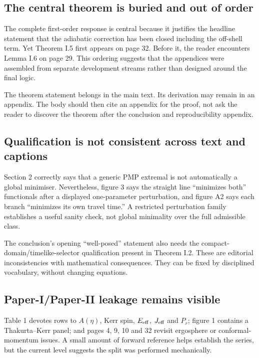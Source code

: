 \documentclass[11pt,a4paper]{article}
\begin{document}
\subsection{The central theorem is buried and out of order}

The complete first-order response is central because it justifies the headline statement that the
adiabatic correction has been closed including the off-shell term.  Yet Theorem I.5 first appears
on page 32.  Before it, the reader encounters Lemma I.6 on page 29.  This ordering suggests that
the appendices were assembled from separate development streams rather than designed around the
final logic.

The theorem statement belongs in the main text.  Its derivation may remain in an appendix.  The
body should then cite an appendix for the proof, not ask the reader to discover the theorem after
the conclusion and reproducibility appendix.

\subsection{Qualification is not consistent across text and captions}

Section 2 correctly says that a generic PMP extremal is not automatically a global minimiser.
Nevertheless, figure 3 says the straight line ``minimizes both'' functionals after a displayed
one-parameter perturbation, and figure A2 says each branch ``minimizes its own travel time.''  A
restricted perturbation family establishes a useful sanity check, not global minimality over the
full admissible class.

The conclusion's opening ``well-posed'' statement also needs the compact-domain/timelike-selector
qualification present in Theorem I.2.  These are editorial inconsistencies with mathematical
consequences.  They can be fixed by disciplined vocabulary, without changing equations.

\subsection{Paper-I/Paper-II leakage remains visible}

Table 1 devotes rows to $A(\eta)$, Kerr spin, $E_{\rm eff}$, $J_{\rm eff}$ and $P_r$; figure 1
contains a Thakurta--Kerr panel; and pages 4, 9, 10 and 32 revisit ergosphere or conformal-momentum
issues.  A small amount of forward reference helps establish the series, but the current level
suggests the split was performed mechanically.
\end{document}
